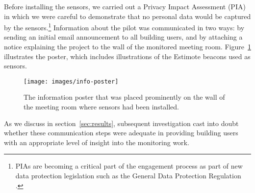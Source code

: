 Before installing the sensors, we carried out a Privacy Impact
Assessment (PIA) in which we were careful to demonstrate that no
personal data would be captured by the sensors.\footnote{PIAs are
  becoming a critical part of the engagement process as part of new
  data protection legislation such as the General Data Protection
  Regulation \cite{GDPR}.} Information about the pilot was
communicated in two ways: by sending an initial email announcement to
all building users, and by attaching a notice explaining the project
to the wall of the monitored meeting room. Figure~\ref{fig:poster}
illustrates the poster, which includes illustrations of the Estimote
beacons used as sensors.
\begin{figure}
  \centering
  \texttt{[image: images/info-poster]}
  \caption{The information poster that
    was placed prominently on the wall of the meeting room where
    sensors had been installed.}
  \label{fig:poster}
\end{figure}
As we discuss in section~\ref{sec:results}, subsequent investigation
cast into doubt whether these communication steps were adequate in providing
building users with an appropriate level of insight into the
monitoring work.

